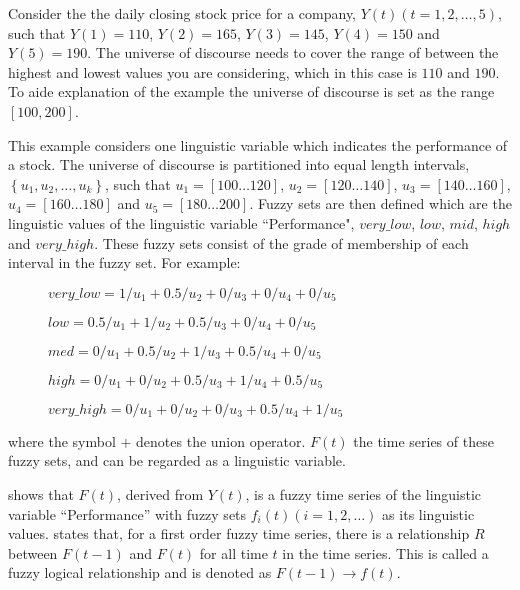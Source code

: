 \documentclass{article}
\theoremstyle{definition}
\begin{document}
\begin{center}
\end{center}

Consider the the daily closing stock price for a company, $Y(t)(t=1,2,\ldots,5)$, such that $Y(1) = 110$, $Y(2) = 165$, $Y(3) = 145$, $Y(4) = 150$ and $Y(5) = 190$. The universe of discourse needs to cover the range of between the highest and lowest values you are considering, which in this case is $110$ and $190$. To aide explanation of the example the universe of discourse is set as the range $[100,200]$.

This example considers one linguistic variable which indicates the performance of a stock. The universe of discourse is partitioned into equal length intervals, $\left\{u_1, u_2,\ldots,u_k\right\}$, such that $u_1 = [100 \ldots 120]$, $u_2 = [120 \ldots 140]$, $u_3 = [140 \ldots 160]$, $u_4 = [160 \ldots 180]$ and $u_5 = [180 \ldots 200]$. Fuzzy sets are then defined which are the linguistic values of the linguistic variable ``Performance", $very\_low$, $low$, $mid$, $high$ and $very\_high$. These fuzzy sets consist of the grade of membership of each interval in the fuzzy set. For example:
\begin{description}
\item[] $very\_low = 1/u_1 + 0.5/u_2 + 0/u_3 + 0/u_4 + 0/u_5$
\item[] $low = 0.5/u_1 + 1/u_2 + 0.5/u_3 + 0/u_4 + 0/u_5$
\item[] $med = 0/u_1 + 0.5/u_2 + 1/u_3 + 0.5/u_4 + 0/u_5$
\item[] $high = 0/u_1 + 0/u_2 + 0.5/u_3 + 1/u_4 + 0.5/u_5$
\item[] $very\_high = 0/u_1 + 0/u_2 + 0/u_3 + 0.5/u_4 + 1/u_5$
\end{description}
where the symbol $+$ denotes the union operator. $F(t)$ the time series of these fuzzy sets, and can be regarded as a linguistic variable.

 shows that $F(t)$, derived from $Y(t)$, is a fuzzy time series of the linguistic variable ``Performance'' with fuzzy sets $f_i(t) (i=1,2,\ldots)$ as its linguistic values.  states that, for a first order fuzzy time series, there is a relationship $R$ between $F(t-1)$ and $F(t)$ for all time $t$ in the time series. This is called a fuzzy logical relationship and is denoted as $F(t-1) \rightarrow f(t)$.
\end{document}
